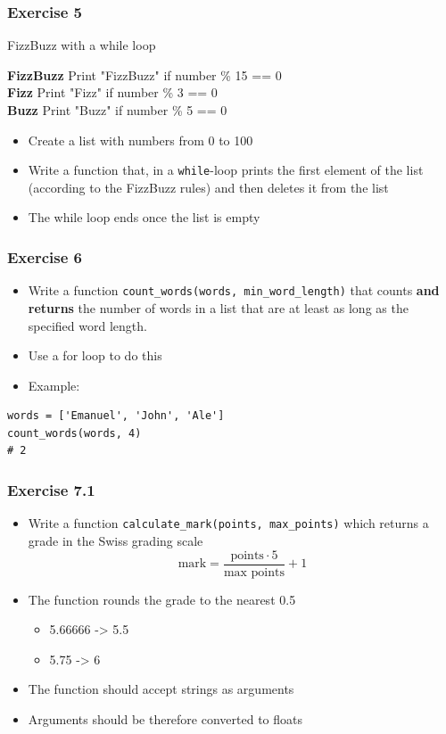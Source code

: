 \documentclass[10pt, a4paper]{beamer} %
\begin{document}
{\begin{frame}[c, fragile]\frametitle{Exercise 5}
    FizzBuzz with a while loop

    \textbf{FizzBuzz} Print "FizzBuzz" if number \% 15 == 0\\
    \textbf{Fizz} Print "Fizz" if number \% 3 == 0\\
    \textbf{Buzz} Print "Buzz" if number \% 5 == 0

    \begin{itemize}
        \item Create a list with numbers from 0 to 100
        \item Write a function that, in a \texttt{while}-loop prints the first element of the list (according to the FizzBuzz rules) and then deletes it from the list
        \item The while loop ends once the list is empty
    \end{itemize}
\end{frame}


\begin{frame}[c, fragile]\frametitle{Exercise 6}
    \begin{itemize}
        \item Write a function \texttt{count\_words(words, min\_word\_length)} that counts \textbf{and returns} the number of words in a list that are at least as long
              as the specified word length.
        \item Use a for loop to do this
        \item Example:
    \end{itemize}

    {
    \mdseries
    \begin{lstlisting}
words = ['Emanuel', 'John', 'Ale']
count_words(words, 4)
# 2
\end{lstlisting}
    }

\end{frame}

\begin{frame}\frametitle{Exercise 7.1}

    \begin{itemize}
        \item Write a function \texttt{calculate\_mark(points, max\_points)} which returns a grade in the Swiss grading scale
              \[ \text{mark} = \frac{\text{points}\cdot 5}{\text{max points}} + 1 \]
        \item The function rounds the grade to the nearest 0.5
              \begin{itemize}
                  \item 5.66666 -> 5.5
                  \item 5.75 -> 6
              \end{itemize}
        \item The function should accept strings as arguments
        \item Arguments should be therefore converted to floats
    \end{itemize}


\end{frame}}
\end{document}
